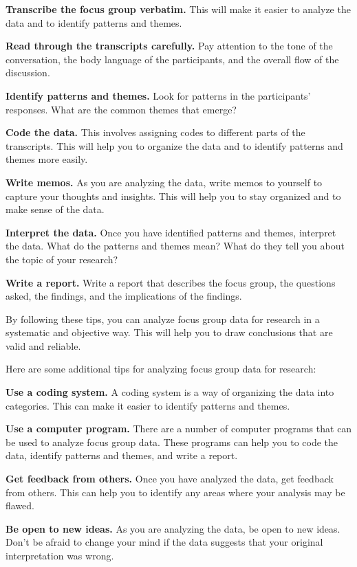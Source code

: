 \documentclass[
  b5paper]{book}
\begin{document}
\textbf{Transcribe the focus group verbatim.} This will make it easier to analyze the data and to identify patterns and themes.

\textbf{Read through the transcripts carefully.} Pay attention to the tone of the conversation, the body language of the participants, and the overall flow of the discussion.

\textbf{Identify patterns and themes.} Look for patterns in the participants' responses. What are the common themes that emerge?

\textbf{Code the data.} This involves assigning codes to different parts of the transcripts. This will help you to organize the data and to identify patterns and themes more easily.

\textbf{Write memos.} As you are analyzing the data, write memos to yourself to capture your thoughts and insights. This will help you to stay organized and to make sense of the data.

\textbf{Interpret the data.} Once you have identified patterns and themes, interpret the data. What do the patterns and themes mean? What do they tell you about the topic of your research?

\textbf{Write a report.} Write a report that describes the focus group, the questions asked, the findings, and the implications of the findings.

By following these tips, you can analyze focus group data for research in a systematic and objective way. This will help you to draw conclusions that are valid and reliable.

Here are some additional tips for analyzing focus group data for research:

\textbf{Use a coding system.} A coding system is a way of organizing the data into categories. This can make it easier to identify patterns and themes.

\textbf{Use a computer program.} There are a number of computer programs that can be used to analyze focus group data. These programs can help you to code the data, identify patterns and themes, and write a report.

\textbf{Get feedback from others.} Once you have analyzed the data, get feedback from others. This can help you to identify any areas where your analysis may be flawed.

\textbf{Be open to new ideas.} As you are analyzing the data, be open to new ideas. Don't be afraid to change your mind if the data suggests that your original interpretation was wrong.
\end{document}
